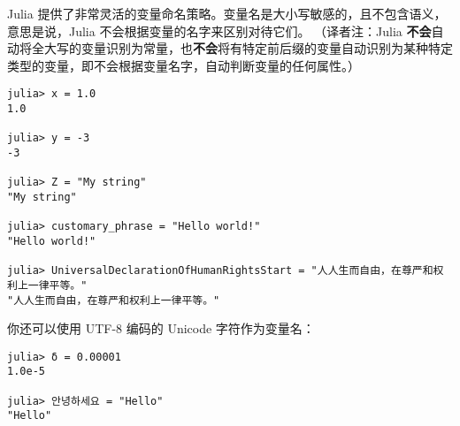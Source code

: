 \documentclass[
  UTF8, %
  a4paper,  %
  oneside,  %
]{ctexbook} %
\begin{document}
Julia 提供了非常灵活的变量命名策略。变量名是大小写敏感的，且不包含语义，意思是说，Julia 不会根据变量的名字来区别对待它们。 （译者注：Julia \textbf{不会}自动将全大写的变量识别为常量，也\textbf{不会}将有特定前后缀的变量自动识别为某种特定类型的变量，即不会根据变量名字，自动判断变量的任何属性。）

\begin{verbatim}
julia> x = 1.0
1.0

julia> y = -3
-3

julia> Z = "My string"
"My string"

julia> customary_phrase = "Hello world!"
"Hello world!"

julia> UniversalDeclarationOfHumanRightsStart = "人人生而自由，在尊严和权利上一律平等。"
"人人生而自由，在尊严和权利上一律平等。"
\end{verbatim}

你还可以使用 UTF-8 编码的 Unicode 字符作为变量名：

\begin{verbatim}
julia> δ = 0.00001
1.0e-5

julia> 안녕하세요 = "Hello"
"Hello"
\end{verbatim}
\end{document}
